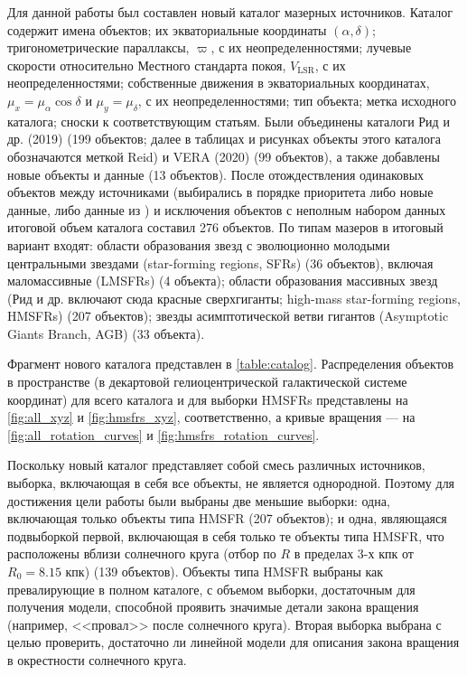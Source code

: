\documentclass[a4paper, oneside, 14pt]{article}
\begin{document}
Для данной работы был составлен новый каталог мазерных источников. Каталог содержит имена объектов; их экваториальные координаты $ (\alpha, \delta) $; тригонометрические параллаксы, $ \varpi $, с их неопределенностями; лучевые скорости относительно Местного стандарта покоя, $ V_\text{LSR} $, с их неопределенностями; собственные движения в экваториальных координатах, $ \mu_x = \mu_\alpha \cos{\delta} $ и $ \mu_y = \mu_\delta $, с их неопределенностями; тип объекта; метка исходного каталога; сноски к соответствующим статьям. Были объединены каталоги Рид и др. (2019) \cite{R.2019} (199 объектов; далее в таблицах и рисунках объекты этого каталога обозначаются меткой Reid) и VERA (2020) \cite{VERA.2020} (99 объектов), а также добавлены новые объекты и данные (13 объектов). После отождествления одинаковых объектов между источниками (выбирались в порядке приоритета либо новые данные, либо данные из \cite{R.2019}) и исключения объектов с неполным набором данных итоговой объем каталога составил 276 объектов. По типам мазеров в итоговый вариант входят: области образования звезд с эволюционно молодыми центральными звездами (star-forming regions, SFRs) (36 объектов), включая маломассивные (LMSFRs) (4 объекта); области образования массивных звезд (Рид и др. включают сюда красные сверхгиганты; high-mass star-forming regions, HMSFRs) (207 объектов); звезды асимптотической ветви гигантов (Asymptotic Giants Branch, AGB) (33 объекта).

Фрагмент нового каталога представлен в \autoref{table:catalog}. Распределения объектов в пространстве (в декартовой гелиоцентрической галактической системе координат) для всего каталога и для выборки HMSFRs представлены на \autoref{fig:all_xyz} и \autoref{fig:hmsfrs_xyz}, соответственно, а кривые вращения --- на \autoref{fig:all_rotation_curves} и \autoref{fig:hmsfrs_rotation_curves}.

Поскольку новый каталог представляет собой смесь различных источников, выборка, включающая в себя все объекты, не является однородной. Поэтому для достижения цели работы были выбраны две меньшие выборки: одна, включающая только объекты типа HMSFR (207 объектов); и одна, являющаяся подвыборкой первой, включающая в себя только те объекты типа HMSFR, что расположены вблизи солнечного круга (отбор по $ R $ в пределах 3-х кпк от $ R_0 = 8.15 $ кпк) (139 объектов). Объекты типа HMSFR выбраны как превалирующие в полном каталоге, с объемом выборки, достаточным для получения модели, способной проявить значимые детали закона вращения (например, <<провал>> после солнечного круга). Вторая выборка выбрана с целью проверить, достаточно ли линейной модели для описания закона вращения в окрестности солнечного круга.
\end{document}
